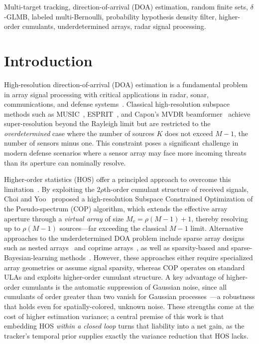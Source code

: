 \documentclass[journal]{IEEEtran}
\begin{document}
\begin{IEEEkeywords}
Multi-target tracking, direction-of-arrival (DOA) estimation, random finite sets, $\delta$-GLMB, labeled multi-Bernoulli, probability hypothesis density filter, higher-order cumulants, underdetermined arrays, radar signal processing.
\end{IEEEkeywords}

\section{Introduction}
\label{sec:intro}

High-resolution direction-of-arrival (DOA) estimation is a fundamental problem in array signal processing with critical applications in radar, sonar, communications, and defense systems~\cite{barshalom2011tracking,neri2018defense}. Classical high-resolution subspace methods such as MUSIC~\cite{schmidt1986music}, ESPRIT~\cite{roy1989esprit}, and Capon's MVDR beamformer~\cite{capon1969mvdr} achieve super-resolution beyond the Rayleigh limit but are restricted to the \emph{overdetermined} case where the number of sources $K$ does not exceed $M-1$, the number of sensors minus one. This constraint poses a significant challenge in modern defense scenarios where a sensor array may face more incoming threats than its aperture can nominally resolve.

Higher-order statistics (HOS) offer a principled approach to overcome this limitation~\cite{porat1991doa,chevalier2006hos}. By exploiting the $2\rho$th-order cumulant structure of received signals, Choi and Yoo~\cite{choi2015underdetermined} proposed a high-resolution Subspace Constrained Optimization of the Pseudo-spectrum (COP) algorithm, which extends the effective array aperture through a \emph{virtual array} of size $M_v = \rho(M-1)+1$, thereby resolving up to $\rho(M-1)$ sources---far exceeding the classical $M-1$ limit. Alternative approaches to the underdetermined DOA problem include sparse array designs such as nested arrays~\cite{pal2010nested} and coprime arrays~\cite{vaidyanathan2011coprime,liu2018superresolution,zhou2018deformed}, as well as sparsity-based and sparse-Bayesian-learning methods~\cite{malioutov2005l1svd,wipf2004sbl,gerstoft2016sbl}. However, these approaches either require specialized array geometries or assume signal sparsity, whereas COP operates on standard ULAs and exploits higher-order cumulant structure. A key advantage of higher-order cumulants is the automatic suppression of Gaussian noise, since all cumulants of order greater than two vanish for Gaussian processes~\cite{mendel1991tutorial}---a robustness that holds even for spatially-colored, unknown noise. These strengths come at the cost of higher estimation variance; a central premise of this work is that embedding HOS \emph{within a closed loop} turns that liability into a net gain, as the tracker's temporal prior supplies exactly the variance reduction that HOS lacks.
\end{document}
